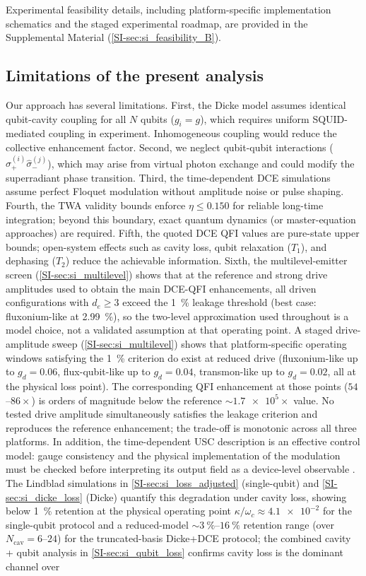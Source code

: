 \documentclass[aps,prxquantum,preprint,superscriptaddress,amsmath,amssymb]{revtex4-2}
\begin{document}
Experimental feasibility details, including platform-specific implementation schematics and the staged experimental roadmap, are provided in the Supplemental Material (\cref{SI-sec:si_feasibility_B}).

\subsection{Limitations of the present analysis}

Our approach has several limitations. First, the Dicke model assumes identical qubit-cavity coupling for all $N$ qubits ($g_i = g$), which requires uniform SQUID-mediated coupling in experiment. Inhomogeneous coupling would reduce the collective enhancement factor. Second, we neglect qubit-qubit interactions ($\hat{\sigma}_+^{(i)}\hat{\sigma}_-^{(j)}$), which may arise from virtual photon exchange and could modify the superradiant phase transition. Third, the time-dependent DCE simulations assume perfect Floquet modulation without amplitude noise or pulse shaping. Fourth, the TWA validity bounds enforce $\eta \le \num{0.150}$ for reliable long-time integration; beyond this boundary, exact quantum dynamics (or master-equation approaches) are required. Fifth, the quoted DCE QFI values are pure-state upper bounds; open-system effects such as cavity loss, qubit relaxation ($T_1$), and dephasing ($T_2$) reduce the achievable information. Sixth, the multilevel-emitter screen (\cref{SI-sec:si_multilevel}) shows that at the reference and strong drive amplitudes used to obtain the main DCE-QFI enhancements, all driven configurations with $d_e\ge3$ exceed the \qty{1}{\percent} leakage threshold (best case: fluxonium-like at \qty{2.99}{\percent}), so the two-level approximation used throughout is a model choice, not a validated assumption at that operating point. A staged drive-amplitude sweep (\cref{SI-sec:si_multilevel}) shows that platform-specific operating windows satisfying the \qty{1}{\percent} criterion do exist at reduced drive (fluxonium-like up to $g_d=0.06$, flux-qubit-like up to $g_d=0.04$, transmon-like up to $g_d=0.02$, all at the physical loss point). The corresponding QFI enhancement at those points ($54$--$86\times$) is orders of magnitude below the reference $\sim\!\num{1.7e5}\times$ value. No tested drive amplitude simultaneously satisfies the leakage criterion and reproduces the reference enhancement; the trade-off is monotonic across all three platforms. In addition, the time-dependent USC description is an effective control model: gauge consistency and the physical implementation of the modulation must be checked before interpreting its output field as a device-level observable \cite{Stokes2021}. The Lindblad simulations in \cref{SI-sec:si_loss_adjusted} (single-qubit) and \cref{SI-sec:si_dicke_loss} (Dicke) quantify this degradation under cavity loss, showing below \qty{1}{\percent} retention at the physical operating point $\kappa/\omega_c\approx\num{4.1e-2}$ for the single-qubit protocol and a reduced-model $\sim\qty{3}{\percent}$--$\qty{16}{\percent}$ retention range (over $N_{\text{cav}}=\num{6}$--$\num{24}$) for the truncated-basis Dicke+DCE protocol; the combined cavity + qubit analysis in \cref{SI-sec:si_qubit_loss} confirms cavity loss is the dominant channel over 
\end{document}
